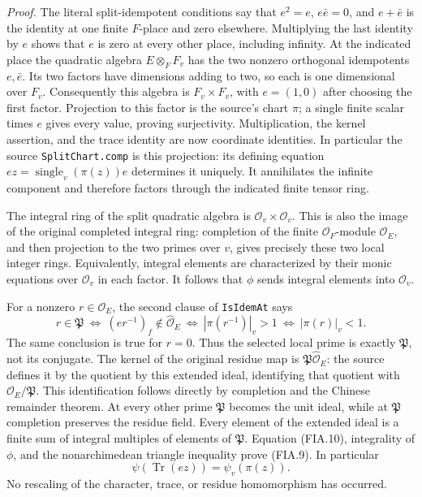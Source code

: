 \emph{Proof.}
The literal split-idempotent conditions say that
\(e^2=e\), \(e\bar e=0\), and \(e+\bar e\) is the identity at
one finite \(F\)-place and zero elsewhere.  Multiplying the last
identity by \(e\) shows that \(e\) is zero at every other place,
including infinity.  At the indicated place the quadratic
algebra \(E\otimes_F F_v\) has the two nonzero orthogonal
idempotents \(e,\bar e\).  Its two factors have dimensions adding
to two, so each is one dimensional over \(F_v\).
Consequently this algebra is \(F_v\times F_v\), with
\(e=(1,0)\) after choosing the first factor.  Projection to this
factor is the source's chart \(\pi\); a single finite scalar
times \(e\) gives every value, proving surjectivity.
Multiplication, the kernel assertion, and the trace identity
are now coordinate identities.  In particular the source
\texttt{SplitChart.comp} is this projection: its defining
equation \(ez=\operatorname{single}_v(\pi(z))e\) determines it
uniquely.  It annihilates the infinite component and therefore
factors through the indicated finite tensor ring.

The integral ring of the split quadratic algebra is
\(\mathcal O_v\times\mathcal O_v\).  This is also the image of
the original completed integral ring: completion of the finite
\(\mathcal O_F\)-module \(\mathcal O_E\), and then projection to
the two primes over \(v\), gives precisely these two local
integer rings.  Equivalently, integral elements are characterized
by their monic equations over \(\mathcal O_v\) in each factor.
It follows that \(\phi\) sends integral elements into
\(\mathcal O_v\).

For a nonzero \(r\in\mathcal O_E\), the second clause of
\texttt{IsIdemAt} says
\[
 r\in\mathfrak P
 \ \Longleftrightarrow\
       (er^{-1})_f\notin\widehat{\mathcal O}_E
 \ \Longleftrightarrow\ |\pi(r^{-1})|_v>1
 \ \Longleftrightarrow\ |\pi(r)|_v<1.
 \tag{FIA.10}
\]
The same conclusion is true for \(r=0\).
Thus the selected local prime is exactly \(\mathfrak P\),
not its conjugate.  The kernel of the original residue map is
\(\mathfrak P\widehat{\mathcal O}_E\): the source defines it by
the quotient by this extended ideal, identifying that quotient
with \(\mathcal O_E/\mathfrak P\).
This identification follows directly by completion and the
Chinese remainder theorem.  At every other prime
\(\mathfrak P\) becomes the unit ideal, while at \(\mathfrak P\)
completion preserves the residue field.
Every element of the extended ideal is a finite sum of
integral multiples of elements of \(\mathfrak P\).
Equation (FIA.10), integrality of \(\phi\), and the
nonarchimedean triangle inequality prove (FIA.9).
In particular
\[
       \psi\!\left(\operatorname{Tr}(ez)\right)=\psi_v(\pi(z)).
 \tag{FIA.11}
\]
No rescaling of the character, trace, or residue homomorphism
has occurred.


